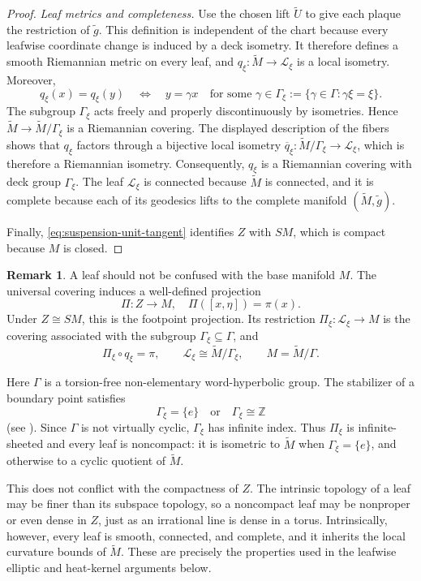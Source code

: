 \documentclass[12pt]{amsart}
\theoremstyle{definition}
\newtheorem*{unnumberedremark}{Remark}
\numberwithin{equation}{section}
\newcommand{\mc}{\mathcal}
\newcommand{\wti}{\widetilde}
\begin{document}
\begin{proof}
\smallskip
\noindent\emph{Leaf metrics and completeness.}
Use the chosen lift \(\wti U\) to give each plaque the restriction of
\(\wti g\).  This definition is independent of the chart because every
leafwise coordinate change is induced by a deck isometry.  It therefore
defines a smooth Riemannian metric on every leaf, and
\(q_\xi\colon\wti M\to\mc L_\xi\) is a local isometry.  Moreover,
\[
  q_\xi(x)=q_\xi(y)
  \quad\Longleftrightarrow\quad
  y=\gamma x
  \quad\text{for some }\gamma\in
  \Gamma_\xi:=\{\gamma\in\Gamma:\gamma\xi=\xi\}.
\]
The subgroup \(\Gamma_\xi\) acts freely and properly discontinuously by
isometries.  Hence \(\wti M\to\wti M/\Gamma_\xi\) is a Riemannian
covering.  The displayed description of the fibers shows that \(q_\xi\)
factors through a bijective local isometry
\(\overline q_\xi\colon\wti M/\Gamma_\xi\to\mc L_\xi\), which is
therefore a Riemannian isometry.  Consequently, \(q_\xi\) is a
Riemannian covering with deck group \(\Gamma_\xi\).
The leaf \(\mc L_\xi\) is connected because \(\wti M\) is connected,
and it is complete because each of its geodesics lifts to the complete
manifold \((\wti M,\wti g)\).

Finally, \eqref{eq:suspension-unit-tangent} identifies \(Z\) with \(SM\),
which is compact because \(M\) is closed.
\end{proof}

\begin{unnumberedremark}
A leaf should not be confused with the base manifold \(M\).  The
universal covering induces a well-defined projection
\[
  \Pi\colon Z\longrightarrow M,
  \quad
  \Pi([x,\eta])=\pi(x).
\]
Under \(Z\cong SM\), this is the footpoint projection.  Its restriction
\(\Pi_\xi\colon\mc L_\xi\to M\) is the covering associated with the
subgroup \(\Gamma_\xi\subseteq\Gamma\), and
\[
  \Pi_\xi\circ q_\xi=\pi,
  \qquad
  \mc L_\xi\cong\wti M/\Gamma_\xi,
  \qquad
  M=\wti M/\Gamma.
\]

Here \(\Gamma\) is a torsion-free non-elementary word-hyperbolic group.
The stabilizer of a boundary point satisfies
\[
  \Gamma_\xi=\{e\}
  \quad\text{or}\quad
  \Gamma_\xi\cong\mathbb Z
\]
(see \cite{Bowditch1998}).  Since \(\Gamma\) is not virtually
cyclic, \(\Gamma_\xi\) has infinite index.  Thus \(\Pi_\xi\) is
infinite-sheeted and every leaf is noncompact: it is isometric to
\(\wti M\) when \(\Gamma_\xi=\{e\}\), and otherwise to a cyclic quotient
of \(\wti M\).

This does not conflict with the compactness of \(Z\).  The intrinsic
topology of a leaf may be finer than its subspace topology, so a
noncompact leaf may be nonproper or even dense in \(Z\), just as an
irrational line is dense in a torus.  Intrinsically, however, every leaf
is smooth, connected, and complete, and it inherits the local curvature
bounds of \(\wti M\).  These are precisely the properties used in the
leafwise elliptic and heat-kernel arguments below.
\end{unnumberedremark}
\end{document}
